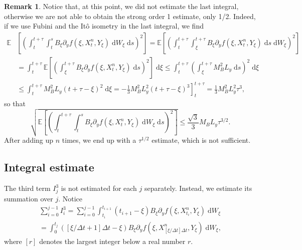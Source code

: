 \documentclass[reqno,12pt]{amsart}
\theoremstyle{plain}%
\theoremstyle{definition}
\newtheorem{rmk}{Remark}[section]
\begin{document}
\begin{rmk}\tiny
Notice that, at this point, we did not estimate the last integral, otherwise we are not able to obtain the strong order 1 estimate, only 1/2. Indeed, if we use Fubini and the It\^o isometry in the last integral, we find
\begin{align*}
  \mathbb{E} & \left[ \left( \int_t^{t + \tau} \int_t^s B_\xi \partial_y f(\xi, X_t^n, Y_\xi)\;\mathrm{d}W_\xi\;\mathrm{d}s \right)^2\right] = \mathbb{E} \left[ \left( \int_t^{t + \tau} \int_\xi^{t+\tau} B_\xi \partial_y f(\xi, X_t^n, Y_\xi) \;\mathrm{d}s\;\mathrm{d}W_\xi \right)^2\right] \\
  & = \int_t^{t + \tau} \mathbb{E} \left[ \left( \int_\xi^{t+\tau} B_\xi \partial_y f(\xi, X_t^n, Y_\xi) \;\mathrm{d}s \right)^2\right] \;\mathrm{d}\xi  \leq  \int_t^{t + \tau}  \left( \int_\xi^{t+\tau} M_B^2 L_y \;\mathrm{d}s \right)^2\;\mathrm{d}\xi \\
  & \leq  \int_t^{t + \tau}  M_B^2 L_y (t + \tau - \xi)^2\;\mathrm{d}\xi  = \left. - \frac{1}{3} M_B^2 L_y^2 (t + \tau - \xi)^3 \right]_t^{t+\tau}  = \frac{1}{3} M_B^2 L_y^2 \tau^3,
\end{align*}
so that
\begin{equation}
\sqrt{\mathbb{E} \left[ \left( \int_t^{t + \tau} \int_t^s B_\xi \partial_y f(\xi, X_t^n, Y_\xi)\;\mathrm{d}W_\xi\;\mathrm{d}s \right)^2\right]} \leq \frac{\sqrt{3}}{3} M_B L_y \tau^{3/2}.
\end{equation}
After adding up $n$ times, we end up with a $\tau^{1/2}$ estimate, which is not sufficient.
\end{rmk}

\subsection{Integral estimate}

The third term $I_j^3$ is not estimated for each $j$ separately. Instead, we estimate its summation over $j$. Notice
\begin{multline*}
\sum_{i=0}^{j-1} I_i^3 = \sum_{i=0}^{j-1} \int_{t_i}^{t_{i+1}} (t_{i+1} - \xi) B_\xi \partial_y f(\xi, X_{t_i}^n, Y_\xi)  \;\mathrm{d}W_\xi \\
 = \int_0^{t_j} \left([\xi/\Delta t + 1]\Delta t - \xi\right) B_\xi \partial_y f(\xi, X_{[\xi/\Delta t]\Delta t}^n, Y_\xi) \;\mathrm{d}W_\xi,
\end{multline*}
where $[r]$ denotes the largest integer below a real number $r$.
\end{document}
